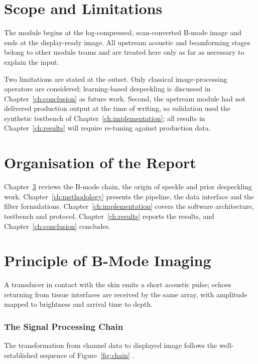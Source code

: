 \documentclass[12pt,a4paper,oneside]{report}
\begin{document}
\section{Scope and Limitations}

The module begins at the log-compressed, scan-converted B-mode image and ends at
the display-ready image. All upstream acoustic and beamforming stages belong to
other module teams and are treated here only as far as necessary to explain the
input.

Two limitations are stated at the outset. Only classical image-processing
operators are considered; learning-based despeckling is discussed in
Chapter~\ref{ch:conclusion} as future work. Second, the upstream module had not
delivered production output at the time of writing, so validation used the
synthetic testbench of Chapter~\ref{ch:implementation}; all results in
Chapter~\ref{ch:results} will require re-tuning against production data.

\section{Organisation of the Report}

Chapter~\ref{ch:background} reviews the B-mode chain, the origin of speckle and
prior despeckling work. Chapter~\ref{ch:methodology} presents the pipeline, the
data interface and the filter formulations. Chapter~\ref{ch:implementation}
covers the software architecture, testbench and protocol.
Chapter~\ref{ch:results} reports the results, and
Chapter~\ref{ch:conclusion} concludes.

\section{Principle of B-Mode Imaging}
\label{ch:background}

A transducer in contact with the skin emits a short acoustic pulse; echoes
returning from tissue interfaces are received by the same array, with amplitude
mapped to brightness and arrival time to depth.



\subsubsection{The Signal Processing Chain}

The transformation from channel data to displayed image follows the
well-established sequence of Figure~\ref{fig:chain} \cite{kang2015musiic}.
\end{document}
